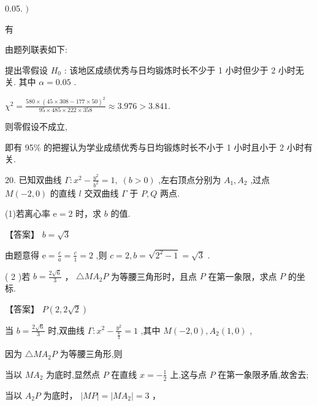 \documentclass[10pt]{article}
\newcommand*\circled[1]{\tikz[baseline=(char.base)]{\node[shape=circle,draw,inner sep=1.5pt] (char) {\small #1};}}
\begin{document}
0.05. \()\)

有

由题列联表如下:

\begin{center}
\end{center}

提出零假设 \({H}_{0}\) : 该地区成绩优秀与日均锻炼时长不少于 1 小时但少于 2 小时无关. 其中 \(\alpha  = {0.05}\) .

\({\chi }^{2} = \frac{{580} \times  {\left( {45} \times  {308} - {177} \times  {50}\right) }^{2}}{{95} \times  {485} \times  {222} \times  {358}} \approx  {3.976} > {3.841}.\)

则零假设不成立,

即有 95\% 的把握认为学业成绩优秀与日均锻炼时长不小于 1 小时且小于 2 小时有关.

20. 已知双曲线 \(\Gamma  : {x}^{2} - \frac{{y}^{2}}{{b}^{2}} = 1,\;\left( {b > 0}\right)\) ,左右顶点分别为 \({A}_{1},{A}_{2}\) ,过点 \(M\left( {-2,0}\right)\) 的直线 \(l\) 交双曲线 \(\Gamma\) 于 \(P,Q\) 两点.

(1)若离心率 \(\mathrm{e} = 2\) 时，求 \(b\) 的值.

【答案】 \(b = \sqrt{3}\)

由题意得 \(\mathrm{e} = \frac{c}{a} = \frac{c}{1} = 2\) ,则 \(c = 2,b = \sqrt{{2}^{2} - 1} = \sqrt{3}\) .

( 2 )若 \(b = \frac{2\sqrt{6}}{3}\) ， \(\bigtriangleup  M{A}_{2}P\) 为等腰三角形时，且点 \(P\) 在第一象限，求点 \(P\) 的坐标.

【答案】 \(P\left( {2,2\sqrt{2}}\right)\)

当 \(b = \frac{2\sqrt{6}}{3}\) 时,双曲线 \(\Gamma  : {x}^{2} - \frac{{y}^{2}}{\frac{8}{3}} = 1\) ,其中 \(M\left( {-2,0}\right) ,{A}_{2}\left( {1,0}\right)\) ,

因为 \(\bigtriangleup M{A}_{2}P\) 为等腰三角形,则

 \circled{1}  当以 \(M{A}_{2}\) 为底时,显然点 \(P\) 在直线 \(x =  - \frac{1}{2}\) 上,这与点 \(P\) 在第一象限矛盾,故舍去;

 \circled{2}  当以 \({A}_{2}P\) 为底时， \(\left| {MP}\right|  = \left| {M{A}_{2}}\right|  = 3\) ，
\end{document}
